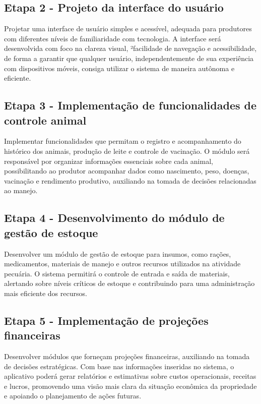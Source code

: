 \subsection{Etapa 2 - Projeto da interface do usuário}

Projetar uma interface de usuário simples e acessível, adequada para produtores com diferentes níveis de familiaridade com tecnologia. A interface será desenvolvida com foco na clareza visual, ²facilidade de navegação e acessibilidade, de forma a garantir que qualquer usuário, independentemente de sua experiência com dispositivos móveis, consiga utilizar o sistema de maneira autônoma e eficiente.

\subsection{Etapa 3 - Implementação de funcionalidades de controle animal}

Implementar funcionalidades que permitam o registro e acompanhamento do histórico dos animais, produção de leite e controle de vacinação. O módulo será responsável por organizar informações essenciais sobre cada animal, possibilitando ao produtor acompanhar dados como nascimento, peso, doenças, vacinação e rendimento produtivo, auxiliando na tomada de decisões relacionadas ao manejo.

\subsection{Etapa 4 - Desenvolvimento do módulo de gestão de estoque}

Desenvolver um módulo de gestão de estoque para insumos, como rações, medicamentos, materiais de manejo e outros recursos utilizados na atividade pecuária. O sistema permitirá o controle de entrada e saída de materiais, alertando sobre níveis críticos de estoque e contribuindo para uma administração mais eficiente dos recursos.

\subsection{Etapa 5 - Implementação de projeções financeiras}

Desenvolver módulos que forneçam projeções financeiras, auxiliando na tomada de decisões estratégicas. Com base nas informações inseridas no sistema, o aplicativo poderá gerar relatórios e estimativas sobre custos operacionais, receitas e lucros, promovendo uma visão mais clara da situação econômica da propriedade e apoiando o planejamento de ações futuras.


